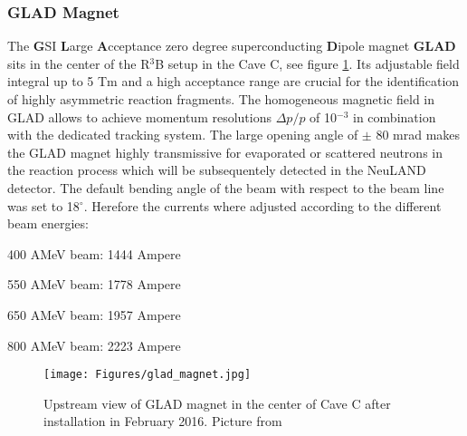 \subsubsection{GLAD Magnet}
The \textbf{G}SI \textbf{L}arge \textbf{A}cceptance zero degree superconducting \textbf{D}ipole magnet \textbf{GLAD} sits in the center of the R$^3$B setup in the Cave C, see figure \ref{fig:GLAD}. Its adjustable field integral up to 5 Tm and a high acceptance range are crucial for the identification of highly asymmetric reaction fragments. The homogeneous magnetic field in GLAD allows to achieve momentum resolutions $\Delta p/p$ of 10$^{-3}$ in combination with the dedicated tracking system.\newline
The large opening angle of $\pm$ 80 mrad makes the GLAD magnet highly transmissive for evaporated or scattered neutrons in the reaction process which will be subsequentely detected in the NeuLAND detector.\newline
The default bending angle of the beam with respect to the beam line was set to 18$^{\circ}$. Herefore the currents where adjusted according to the different beam energies:
\newenvironment{tight_enumerate}{
\begin{enumerate}
  \setlength{\itemsep}{0pt}
  \setlength{\parskip}{0pt}
}{\end{enumerate}}
\begin{tight_enumerate}
\item 400 AMeV beam: 1444 Ampere
\item 550 AMeV beam: 1778 Ampere
\item 650 AMeV beam: 1957 Ampere
\item 800 AMeV beam: 2223 Ampere
\end{tight_enumerate}
\begin{figure}[htpb]
    \centering
    \texttt{[image: Figures/glad\_magnet.jpg]}
    \caption{
    Upstream view of GLAD magnet in the center of Cave C after installation in February 2016. Picture from \cite{wiki:GLAD} 
    }
    \label{fig:GLAD}
\end{figure}

